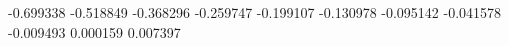 -0.699338
-0.518849
-0.368296
-0.259747
-0.199107
-0.130978
-0.095142
-0.041578
-0.009493
0.000159
0.007397
